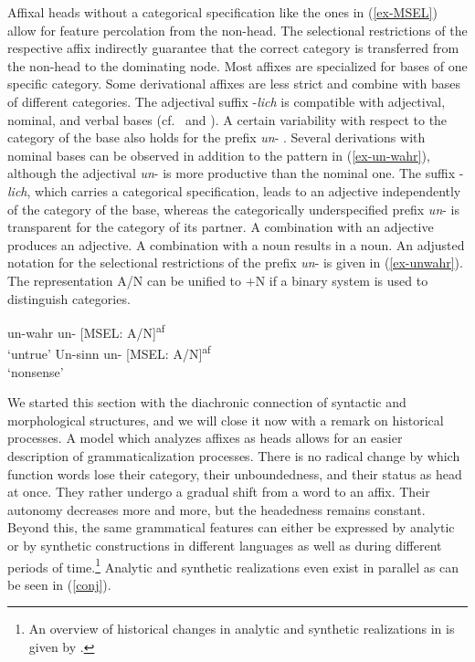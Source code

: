 \documentclass[output=paper
  ,nobabel
  ,draftmode
  ,colorlinks, citecolor=brown
]{langscibook}
\begin{document}
\noindent Affixal heads without a categorical specification like the ones in (\ref{ex-MSEL}) allow for feature percolation from the non-head. The selectional restrictions of the respective affix indirectly guarantee that the correct category is transferred from the non-head to the dominating node. Most affixes are specialized for bases of one specific category. Some derivational affixes are less strict and combine with bases of different categories. The adjectival suffix -\emph{lich} is compatible with adjectival, nominal, and verbal bases (cf.\ \cite[260--263]{FleischerBarz1995} and \cite[141--142]{AltmannKemmerling2000}). A certain variability with respect to the category of the base also holds for the prefix \emph{un}- \citep[cf.][]{Schnerrer1982}. Several derivations with nominal bases can be observed in addition to the pattern in (\ref{ex-un-wahr}), although the adjectival \emph{un}- is more productive than the nominal one. The suffix -\emph{lich}, which carries a categorical specification, leads to an adjective independently of the category of the base, whereas the categorically underspecified prefix \emph{un}{}- is transparent for the category of its partner. A combination with an adjective produces an adjective. A combination with a noun results in a noun. An adjusted notation for the selectional restrictions of the prefix \emph{un}{}- is given in (\ref{ex-unwahr}). The representation A/N can be unified to $+$N if a binary system is used to distinguish categories.

\eal
\label{ex-unwahr}
\ex un-wahr \hspace{10pt} un- [MSEL: A/N]\textsuperscript{af}\\`untrue' 
\ex Un-sinn \hspace{11.5pt} un- [MSEL: A/N]\textsuperscript{af}\\`nonsense'
\zl

\noindent 
We started this section with the diachronic connection of syntactic and morphological structures, and we will close it now with a remark on historical processes. A model which analyzes affixes as heads allows for an easier description of grammaticalization processes. There is no radical change by which function words lose their category, their unboundedness, and their status as head at once. They rather undergo a gradual shift from a word to an affix. Their autonomy decreases more and more, but the headedness remains constant. Beyond this, the same grammatical features can either be expressed by analytic or by synthetic constructions in different languages as well as during different periods of time.\footnote{An overview of historical changes in analytic and synthetic realizations in  is given by \citet[Section~11]{NueblingEtAl2010}.} Analytic and synthetic realizations even exist in parallel as can be seen in (\ref{conj}).
\end{document}

